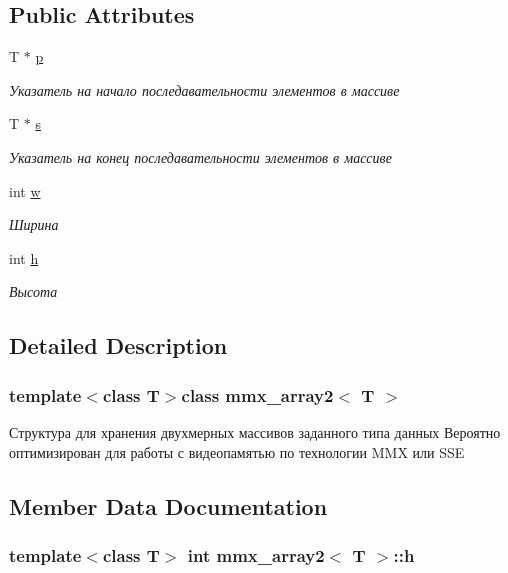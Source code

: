 \subsection*{Public Attributes}
\begin{DoxyCompactItemize}
\item 
T $\ast$ \hyperlink{classmmx__array2_af58c57c4dbbe49a06d90d077498f9a3c}{p}
\begin{DoxyCompactList}\small\item\em Указатель на начало последавательности элементов в массиве \end{DoxyCompactList}\item 
T $\ast$ \hyperlink{classmmx__array2_a010e161d462fb8026ed80d00cdbacb57}{s}
\begin{DoxyCompactList}\small\item\em Указатель на конец последавательности элементов в массиве \end{DoxyCompactList}\item 
int \hyperlink{classmmx__array2_aaa57fdc3151aefd7e9019db52310e222}{w}
\begin{DoxyCompactList}\small\item\em Ширина \end{DoxyCompactList}\item 
int \hyperlink{classmmx__array2_a5466374e097f5bb0b5999cf25a813155}{h}
\begin{DoxyCompactList}\small\item\em Высота \end{DoxyCompactList}\end{DoxyCompactItemize}


\subsection{Detailed Description}
\subsubsection*{template$<$class T$>$class mmx\+\_\+array2$<$ T $>$}

Структура для хранения двухмерных массивов заданного типа данных Вероятно оптимизирован для работы с видеопамятью по технологии M\+M\+X или S\+S\+E 



\subsection{Member Data Documentation}
\hypertarget{classmmx__array2_a5466374e097f5bb0b5999cf25a813155}{
\subsubsection[{h}]{\setlength{\rightskip}{0pt plus 5cm}template$<$class T$>$ int {\bf mmx\+\_\+array2}$<$ T $>$\+::h}}\label{classmmx__array2_a5466374e097f5bb0b5999cf25a813155}


